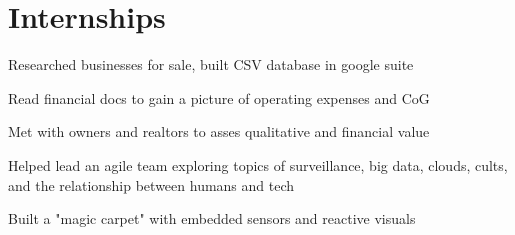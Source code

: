 \documentclass[]{quinnJarvisHollandLatex}
\begin{document}
\begin{minipage}[t]{0.60\textwidth}
\section{Internships}
\begin{tightemize}
\item Researched businesses for sale, built CSV database in google suite
\item Read financial docs to gain a picture of operating expenses and CoG
\item Met with owners and realtors to asses qualitative and financial value
\end{tightemize}
\begin{tightemize}
\item{Helped lead an agile team exploring topics of surveillance, big data, clouds, cults, and the relationship between humans and tech}
\item{Built a "magic carpet"  with embedded sensors and reactive visuals}
\end{tightemize}
%
%

\end{minipage}
\hfill
\end{document}
